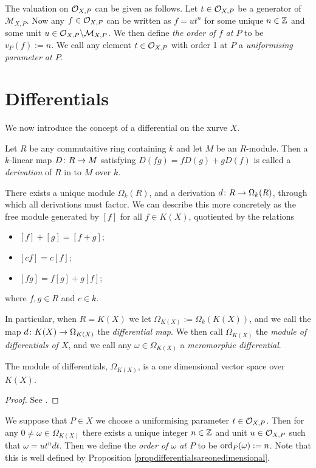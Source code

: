 The valuation on ${\cal O}_{X,P}$ can be given as follows.
Let $t \in {\cal O}_{X,P}$ be a generator of $\mathcal{M}_{X,P}$.
Now any $f \in {\cal O}_{X,P}$ can be written as $f = ut^n$ for some unique $n \in {\mathbb Z}$ and some unit $u \in {\cal O}_{X,P}\backslash \mathcal{M}_{X,P}$.
We then define \emph{the order of $f$ at $P$} to be $v_P(f) := n$.
We call any element $t \in {\cal O}_{X,P}$ with order 1 at $P$ a \emph{uniformising parameter at $P$}.

\section{Differentials}

We now introduce the concept of a differential on the xurve $X$.

Let $R$ be any commutaitive ring containing $k$ and let $M$ be an $R$-module.
Then a $k$-linear map $D \colon R \rightarrow M$ satisfying $D(fg) = fD(g) + gD(f)$ is called a \emph{derivation} of $R$ in to $M$ over $k$.

There exists a unique module $\Omega_k(R)$, and a derivation $d \colon R \rightarrow \Omega_k(R)$, through which all derivations must factor.
We can describe this more concretely as the free module generated by $[f]$ for all $f \in K(X)$, quotiented by the relations
    \begin{itemize}
    \item $[f]+[g] = [f+g]$;
    \item $[cf] = c[f]$;
    \item $[fg] = f[g] + g[f]$;
    \end{itemize}
where $f, g \in R$ and $c \in k$.

In particular, when $R = K(X)$ we let $\Omega_{K(X)} := \Omega_k(K(X))$, and we call the map $d \colon K(X) \rightarrow \Omega_{K(X)}$ the \emph{differential map}.
We then call $\Omega_{K(X)}$ the \emph{module of differentials of $X$}, and we call any $ \omega \in \Omega_{K(X)}$ a \emph{meromorphic differential}.

    \begin{prop}\label{propdifferentialsareonedimensional}
    The module of differentials, $\Omega_{K(X)}$, is a one dimensional vector space over $K(X)$.
    \end{prop}
    \begin{proof}
    See \cite[Prop. 1.5.9]{stichtenoth}.
    \end{proof}

We suppose that $P \in X$ we choose a uniformising parameter $t \in {\cal O}_{X,P}$.
Then for any $ 0 \neq \omega \in \Omega_{K(X)}$ there exists a unique integer $n \in {\mathbb Z}$ and unit $u \in {\cal O}_{X,P}$ such that $\omega = ut^ndt$.
Then we define the \emph{order of $\omega$ at $P$} to be $\operatorname{ord}_P(\omega) := n$.
Note that this is well defined by Proposition \ref{propdifferentialsareonedimensional}.

